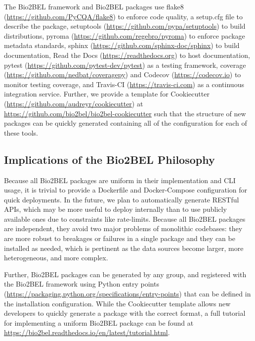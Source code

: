 The Bio2BEL framework and Bio2BEL packages use flake8 (\url{https://github.com/PyCQA/flake8}) to enforce code quality, a setup.cfg file to describe the package, setuptools (\url{https://github.com/pypa/setuptools}) to build distributions, pyroma (\url{https://github.com/regebro/pyroma}) to enforce package metadata standards, sphinx (\url{https://github.com/sphinx-doc/sphinx}) to build documentation, Read the Docs (\url{https://readthedocs.org}) to host documentation, pytest (\url{https://github.com/pytest-dev/pytest}) as a testing framework, coverage (\url{https://github.com/nedbat/coveragepy}) and Codecov (\url{https://codecov.io}) to monitor testing coverage, and Travis-CI (\url{https://travis-ci.com}) as a continuous integration service.
Further, we provide a template for Cookiecutter (\url{https://github.com/audreyr/cookiecutter}) at \url{https://github.com/bio2bel/bio2bel-cookiecutter} such that the structure of new packages can be quickly generated containing all of the configuration for each of these tools.

\subsection*{Implications of the Bio2BEL Philosophy}
Because all Bio2BEL packages are uniform in their implementation and CLI usage, it is trivial to provide a Dockerfile and Docker-Compose configuration for quick deployments.
In the future, we plan to automatically generate RESTful APIs, which may be more useful to deploy internally than to use publicly available ones due to constraints like rate-limits.
Because all Bio2BEL packages are independent, they avoid two major problems of monolithic codebases: they are more robust to breakages or failures in a single package and they can be installed as needed, which is pertinent as the data sources become larger, more heterogeneous, and more complex.

Further, Bio2BEL packages can be generated by any group, and registered with the Bio2BEL framework using Python entry points (\url{https://packaging.python.org/specifications/entry-points}) that can be defined in the installation configuration.
While the Cookiecutter template allows new developers to quickly generate a package with the correct format, a full tutorial for implementing a uniform Bio2BEL package can be found at \url{https://bio2bel.readthedocs.io/en/latest/tutorial.html}.
